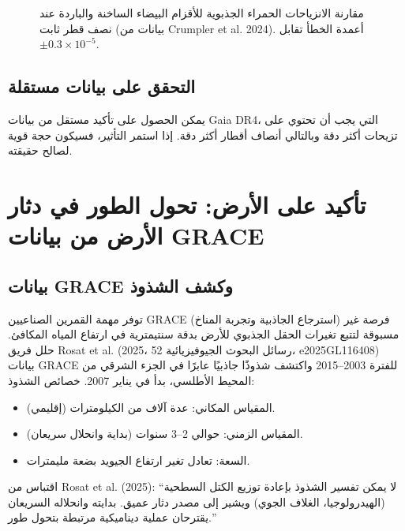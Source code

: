 \documentclass[11pt,a4paper]{article}
\begin{document}
	\begin{figure}[htbp]
		\centering
		\caption{مقارنة الانزياحات الحمراء الجذبوية للأقزام البيضاء الساخنة والباردة عند نصف قطر ثابت (بيانات من Crumpler et al. 2024). أعمدة الخطأ تقابل $\pm0.3\times10^{-5}$.}
		\label{fig:wd-redshift}
	\end{figure}
	
	\subsection{التحقق على بيانات مستقلة}
	\label{subsec:wd-verification}
	
	يمكن الحصول على تأكيد مستقل من بيانات Gaia DR4، التي يجب أن تحتوي على تزيحات أكثر دقة وبالتالي أنصاف أقطار أكثر دقة. إذا استمر التأثير، فسيكون حجة قوية لصالح حقيقته.
	
	\section{تأكيد على الأرض: تحول الطور في دثار الأرض من بيانات GRACE}
	\label{sec:grace}
	
	\subsection{بيانات GRACE وكشف الشذوذ}
	\label{subsec:grace-data}
	
	توفر مهمة القمرين الصناعيين GRACE (استرجاع الجاذبية وتجربة المناخ) فرصة غير مسبوقة لتتبع تغيرات الحقل الجذبوي للأرض بدقة سنتيمترية في ارتفاع المياه المكافئ. حلل فريق Rosat et al. (2025، رسائل البحوث الجيوفيزيائية 52، e2025GL116408) بيانات GRACE للفترة 2003–2015 واكتشف شذوذًا جاذبيًا عابرًا في الجزء الشرقي من المحيط الأطلسي، بدأ في يناير 2007. خصائص الشذوذ:
	\begin{itemize}
		\item المقياس المكاني: عدة آلاف من الكيلومترات (إقليمي).
		\item المقياس الزمني: حوالي 2–3 سنوات (بداية وانحلال سريعان).
		\item السعة: تعادل تغير ارتفاع الجيويد بضعة مليمترات.
	\end{itemize}
	اقتباس من Rosat et al. (2025): ``لا يمكن تفسير الشذوذ بإعادة توزيع الكتل السطحية (الهيدرولوجيا، الغلاف الجوي) ويشير إلى مصدر دثار عميق. بدايته وانحلاله السريعان يقترحان عملية ديناميكية مرتبطة بتحول طور.''
	
\end{document}
